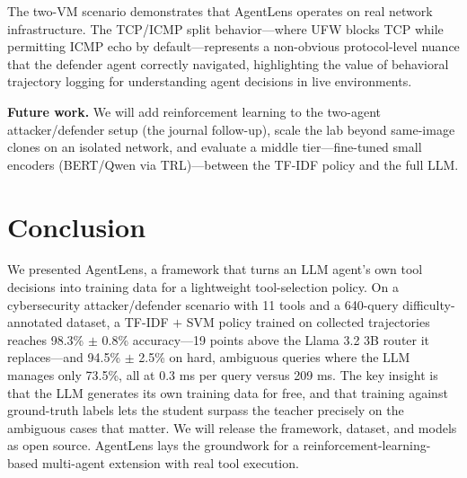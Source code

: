 \documentclass[conference]{IEEEtran}
\begin{document}
The two-VM scenario demonstrates that AgentLens operates on real network
infrastructure. The TCP/ICMP split behavior---where UFW blocks TCP while
permitting ICMP echo by default---represents a non-obvious protocol-level nuance
that the defender agent correctly navigated, highlighting the value of behavioral
trajectory logging for understanding agent decisions in live environments.

\textbf{Future work.} We will add reinforcement learning to the two-agent
attacker/defender setup (the journal follow-up), scale the lab beyond same-image
clones on an isolated network, and evaluate a middle tier---fine-tuned small
encoders (BERT/Qwen via TRL)---between the TF-IDF policy and the full LLM.

\section{Conclusion}

We presented AgentLens, a framework that turns an LLM agent's own tool decisions
into training data for a lightweight tool-selection policy. On a cybersecurity
attacker/defender scenario with 11 tools and a 640-query difficulty-annotated
dataset, a TF-IDF $+$ SVM policy trained on collected trajectories reaches
98.3\% $\pm$ 0.8\% accuracy---19 points above the Llama 3.2 3B router it
replaces---and 94.5\% $\pm$ 2.5\% on hard, ambiguous queries where the LLM
manages only 73.5\%, all at 0.3 ms per query versus 209 ms. The key insight is
that the LLM generates its own training data for free, and that training against
ground-truth labels lets the student surpass the teacher precisely on the
ambiguous cases that matter. We will release the framework, dataset, and models
as open source. AgentLens lays the groundwork for a reinforcement-learning-based
multi-agent extension with real tool execution.
\end{document}
